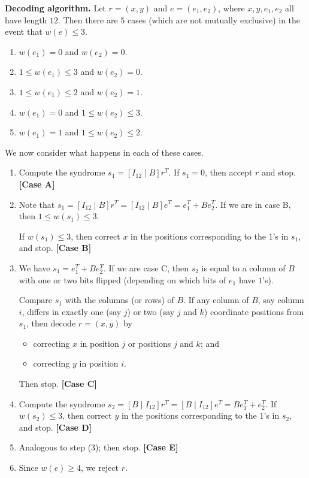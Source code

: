 \documentclass[10pt]{article}
\theoremstyle{newstyle}
\begin{document}
{\bf Decoding algorithm.} Let $r = (x, y)$ and $e = (e_1, e_2)$, where $x, y, e_1, e_2$ all 
have length $12$. Then there are $5$ cases (which are not mutually exclusive) in the event that 
$w(e) \leq 3$. 
\begin{enumerate}[\bf (A)]
    \item $w(e_1) = 0$ and $w(e_2) = 0$. 
    \item $1 \leq w(e_1) \leq 3$ and $w(e_2) = 0$. 
    \item $1 \leq w(e_1) \leq 2$ and $w(e_2) = 1$.
    \item $w(e_1) = 0$ and $1 \leq w(e_2) \leq 3$.
    \item $w(e_1) = 1$ and $1 \leq w(e_2) \leq 2$.
\end{enumerate}
We now consider what happens in each of these cases. 
\begin{enumerate}[(1)]
    \item Compute the syndrome $s_1 = [I_{12} \mid B]r^T$. If $s_1 = 0$, then accept 
    $r$ and stop. {\bf [Case A]}
    \item Note that $s_1 = [I_{12} \mid B]r^T = [I_{12} \mid B]e^T = e_1^T + Be_2^T$. If we 
    are in case B, then $1 \leq w(s_1) \leq 3$. 
    
    If $w(s_1) \leq 3$, then correct $x$ in the positions corresponding to the $1$'s in $s_1$, and 
    stop. {\bf [Case B]}
    \item We have $s_1 = e_1^T + Be_2^T$. If we are case C, then $s_2$ is equal to a column of 
    $B$ with one or two bits flipped (depending on which bits of $e_1$ have $1$'s). 
    
    Compare $s_1$ with the columns (or rows) of $B$. If any column of $B$, say column $i$, 
    differs in exactly one (say $j$) or two (say $j$ and $k$) coordinate positions from $s_1$, 
    then decode $r = (x, y)$ by 
    \begin{itemize}
        \item correcting $x$ in position $j$ or positions $j$ and $k$; and 
        \item correcting $y$ in position $i$.
    \end{itemize}
    Then stop. {\bf [Case C]}
    \item Compute the syndrome $s_2 = [B \mid I_{12}]r^T = [B \mid I_{12}]e^T = Be_1^T + e_2^T$. 
    If $w(s_2) \leq 3$, then correct $y$ in the positions corresponding to the $1$'s in $s_2$,
    and stop. {\bf [Case D]} 
    \item Analogous to step (3); then stop. {\bf [Case E]}
    \item Since $w(e) \geq 4$, we reject $r$. 
\end{enumerate}
\end{document}
